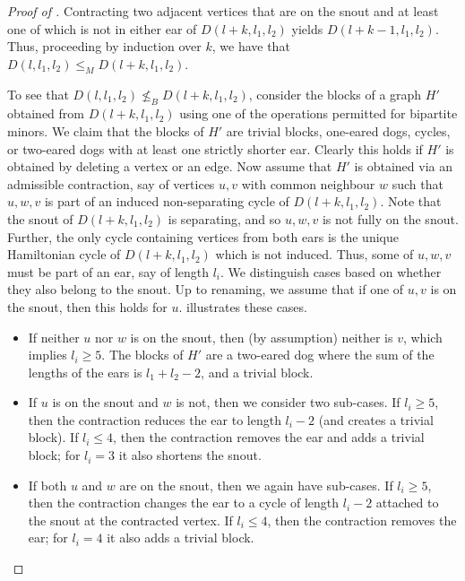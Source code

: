 \documentclass[a4paper,preprint,12pt]{elsarticle}
\begin{document}
\begin{proof}[Proof of ]
    Contracting two adjacent vertices that are on the snout and at least one of which is not in either ear of $D(l+k,l_1,l_2)$ yields $D(l+k-1,l_1,l_2)$.
    Thus, proceeding by induction over $k$, we have that $D(l,l_1,l_2)\leq_{M}D(l+k,l_1,l_2)$.

    To see that $D(l,l_1,l_2)\not\leq_{B}D(l+k,l_1,l_2)$, consider the blocks of a graph $H'$ obtained from $D(l+k,l_1,l_2)$ using one of the operations permitted for bipartite minors.   We claim that the blocks of $H'$ are trivial blocks, 
    one-eared dogs, cycles, or two-eared dogs with at least one strictly shorter ear.
    Clearly this holds if $H'$ is obtained by deleting a vertex or an edge.
    Now assume that $H'$ is obtained via an admissible contraction, say of vertices $u,v$ with common neighbour $w$ such that $u,w,v$ is part of an induced non-separating cycle of $D(l+k,l_1,l_2)$.
    Note that the snout of $D(l+k,l_1,l_2)$ is separating, and so $u,w,v$ is not fully on the snout.
    Further, the only cycle containing vertices from both ears is the unique Hamiltonian cycle of $D(l+k,l_1,l_2)$ which is not induced.
    Thus, some of $u,w,v$ must be part of an ear, say of length $l_i$.
    We distinguish cases based on whether they also belong to the snout.
    Up to renaming, we assume that if one of $u,v$ is on the snout, then this holds for $u$.
     illustrates these cases.
        \begin{itemize}
            \item [1.] If neither $u$ nor $w$ is on the snout, then (by assumption) neither is $v$, which implies $l_i\geq 5$.
            The blocks of $H'$ are a two-eared dog where the sum of the lengths of the ears is $l_1+l_2-2$, and a trivial block.
            \item [2.] If $u$ is on the snout and $w$ is not, then we consider two sub-cases.
            If $l_i\geq 5$, then the contraction reduces the ear to length $l_i-2$ (and creates a trivial block).
            If $l_i\leq 4$, then the contraction removes the ear and adds a trivial block; for $l_i=3$ it also shortens the snout.
            \item [3.] If both $u$ and $w$ are on the snout, then we again have sub-cases.
            If $l_i\geq 5$, then the contraction changes the ear to a cycle of length $l_i-2$ attached to the snout at the contracted vertex. 
            If $l_i\leq 4$, then the contraction removes the ear; for $l_i=4$ it also adds a trivial block. 
        \end{itemize}
    

\end{proof}
\end{document}
